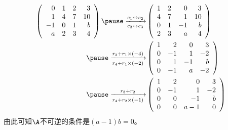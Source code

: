 \begin{frame}\ft{\secname}
\begin{jie}
$$
\begin{aligned}
  \left(
  \begin{array}{rrrr}
  0&1&2&3\\
  1&4&7&10\\
  -1&0&1&b\\
  a&2&3&4
  \end{array}
  \right)\pause\xrightarrow[c_2\leftrightarrow c_3]{c_1\leftrightarrow c_2} &
  \left(
    \begin{array}{rrrr}
      1 & 2 & 0 & 3\\
      4 & 7 & 1 & 10\\
      0 & 1 & -1 & b\\
      2 & 3 & a & 4\\
    \end{array}
  \right)\\\pause
  \xrightarrow[r_4+r_1\times(-2)]{r_2+r_1\times(-4)}&
  \left(
    \begin{array}{rrrr}
      1 & 2 & 0 & 3\\
      0 & -1 & 1 & -2\\
      0 & 1 & -1 & b\\
      0 & -1 & a & -2\\
    \end{array}
  \right)\\\pause
  \xrightarrow[r_4+r_2\times(-1)]{r_3+r_2}&
  \left(
    \begin{array}{rrrr}      
      1 & 2 & 0 & 3\\
      0 & -1 & 1 & -2\\
      0 & 0 & -1 & b\\
      0 & 0 & a-1 & 0\\
    \end{array}
  \right)
\end{aligned}
$$\pause
由此可知$\A$不可逆的条件是$(a-1)b=0$。
\end{jie}
\end{frame}

